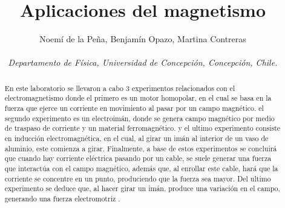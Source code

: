 \documentclass[]{article}
\title{Aplicaciones del magnetismo}
\author{Noemí de la Peña, Benjamín Opazo, Martina Contreras \\ \\
 \textit{ Departamento de Física, Universidad de Concepción, Concepción, Chile. }}
\date{}
\begin{document}
\maketitle 



    


\begin{abstract}
    En este laboratorio se llevaron a cabo 3 experimentos relacionados con el electromagnetismo donde el primero es un motor homopolar, en el cual se basa en la fuerza que ejerce un corriente en movimiento al pasar por un campo magnético. el segundo experimento es un electroimán, donde se genera campo magnético por medio de traspaso de corriente y un material ferromagnético. y el ultimo experimento consiste en inducción electromagnética, en el cual, al girar un imán al interior de un vaso de aluminio, este comienza a girar.
Finalmente, a base de estos experimentos se concluirá que cuando hay corriente eléctrica pasando por un cable, se suele generar una fuerza que interactúa con el campo magnético, además que, al enrollar este cable, hará que la corriente se concentre en un punto, produciendo que la fuerza sea mayor. Del ultimo experimento se deduce que, al hacer girar un imán, produce una variación en el campo, generando una fuerza electromotriz .

\end{abstract}
\end{document}
